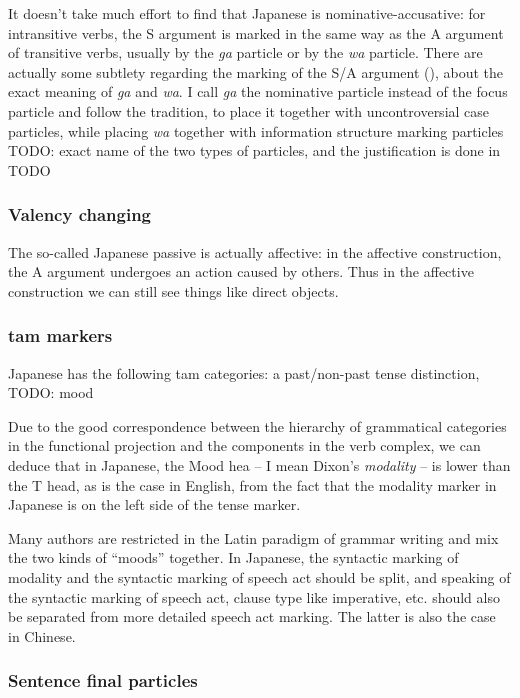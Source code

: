 \documentclass[UTF8, a4paper, oneside, scheme=plain]{ctexart}
\newcommand*{\term}[1]{\emph{#1}}
\newcommand{\corpus}[1]{\emph{#1}}
\begin{document}
It doesn't take much effort to find that Japanese is nominative-accusative:
for intransitive verbs,
the S argument is marked in the same way as the A argument of transitive verbs,
usually by the \corpus{ga} particle or by the \corpus{wa} particle.
There are actually some subtlety regarding the marking of the S/A argument (),
about the exact meaning of \corpus{ga} and \corpus{wa}.
I call \corpus{ga} the nominative particle instead of the focus particle 
and follow the tradition, to place it together with uncontroversial case particles,
while placing \corpus{wa} together with information structure marking particles TODO: exact name of the two types of particles,
and the justification is done in TODO

\subsubsection{Valency changing}

The so-called Japanese passive is actually affective:
in the affective construction, the A argument undergoes an action caused by others. 
Thus in the affective construction we can still see things like direct objects.

\subsubsection{\Acl{tam} markers}

Japanese has the following \ac{tam} categories:
a past/non-past tense distinction,
TODO: mood

Due to the good correspondence between the hierarchy of grammatical categories in the functional projection 
and the components in the verb complex,
we can deduce that in Japanese, the Mood hea -- I mean Dixon's \term{modality} -- 
is lower than the T head, as is the case in English, 
from the fact that the modality marker in Japanese is on the left side of the tense marker.

Many authors are restricted in the Latin paradigm of grammar writing 
and mix the two kinds of ``moods'' together.
In Japanese, the syntactic marking of modality and the syntactic marking of speech act 
should be split,
and speaking of the syntactic marking of speech act,
clause type like imperative, etc. should also be separated from more detailed speech act marking.
The latter is also the case in Chinese.

\subsubsection{Sentence final particles}
\end{document}
